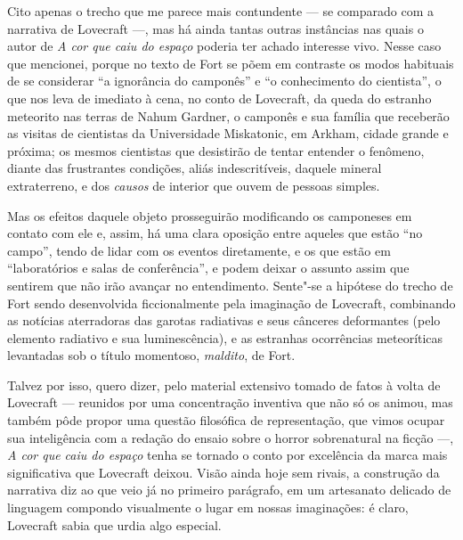 Cito apenas o trecho que me parece mais contundente --- se comparado com
a narrativa de Lovecraft ---, mas há ainda tantas outras instâncias nas
quais o autor de \textit{A cor que caiu do espaço} poderia ter achado
interesse vivo. Nesse caso que mencionei, porque no texto de Fort se
põem em contraste os modos habituais de se considerar ``a ignorância
do camponês'' e ``o conhecimento do cientista'', o que nos leva de
imediato à cena, no conto de Lovecraft, da queda do estranho meteorito
nas terras de Nahum Gardner, o camponês e sua família que receberão as
visitas de cientistas da Universidade Miskatonic, em Arkham, cidade
grande e próxima; os mesmos cientistas que desistirão de tentar entender
o fenômeno, diante das frustrantes condições, aliás indescritíveis,
daquele mineral extraterreno, e dos \textit{causos} de interior que ouvem de
pessoas simples.

Mas os efeitos daquele objeto prosseguirão modificando os camponeses em
contato com ele e, assim, há uma clara oposição entre aqueles que estão
``no campo'', tendo de lidar com os eventos diretamente, e os que estão
em ``laboratórios e salas de conferência'', e podem deixar o assunto
assim que sentirem que não irão avançar no entendimento. Sente"-se a
hipótese do trecho de Fort sendo desenvolvida ficcionalmente pela
imaginação de Lovecraft, combinando as notícias aterradoras das garotas
radiativas e seus cânceres deformantes (pelo elemento radiativo e sua
luminescência), e as estranhas ocorrências meteoríticas levantadas sob o
título momentoso, \textit{maldito}, de Fort.


Talvez por isso, quero dizer, pelo material extensivo tomado de fatos à
volta de Lovecraft --- reunidos por uma concentração inventiva que não
só os animou, mas também pôde propor uma questão filosófica de
representação, que vimos ocupar sua inteligência com a redação do ensaio
sobre o horror sobrenatural na ficção ---, \textit{A cor que caiu do espaço}
tenha se tornado o conto por excelência da marca mais significativa que
Lovecraft deixou. Visão ainda hoje sem rivais, a construção da narrativa
diz ao que veio já no primeiro parágrafo, em um artesanato delicado de
linguagem compondo visualmente o lugar em nossas imaginações: é claro,
Lovecraft sabia que urdia algo especial.

